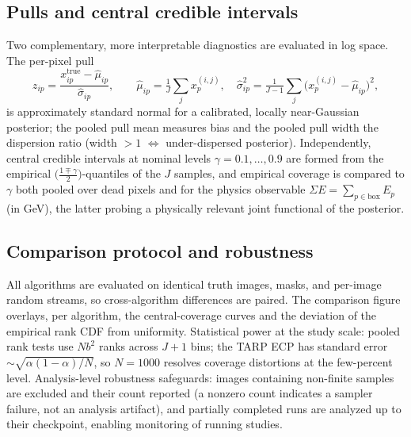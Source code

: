 \subsection{Pulls and central credible intervals}
\label{sec:validation:pulls}

Two complementary, more interpretable diagnostics are evaluated in log
space.  The per-pixel pull
\begin{equation}
  z_{ip} = \frac{x^{\mathrm{true}}_{ip} - \widehat{\mu}_{ip}}
                {\widehat{\sigma}_{ip}},
  \qquad
  \widehat{\mu}_{ip} = \tfrac{1}{J}\textstyle\sum_j x^{(i,j)}_p,
  \quad
  \widehat{\sigma}_{ip}^2 =
      \tfrac{1}{J-1}\textstyle\sum_j
      \bigl(x^{(i,j)}_p - \widehat{\mu}_{ip}\bigr)^2,
  \label{eq:pull}
\end{equation}
is approximately standard normal for a calibrated, locally
near-Gaussian posterior; the pooled pull mean measures bias and the
pooled pull width the dispersion ratio (width $> 1$ $\Leftrightarrow$
under-dispersed posterior).  Independently, central credible intervals
at nominal levels $\gamma = 0.1, \dots, 0.9$ are formed from the
empirical $\bigl(\tfrac{1\mp\gamma}{2}\bigr)$-quantiles of the $J$
samples, and empirical coverage is compared to $\gamma$ both pooled over
dead pixels and for the physics observable
$\Sigma E = \sum_{p \in \mathrm{box}} E_p$ (in GeV), the latter probing
a physically relevant joint functional of the posterior.

\subsection{Comparison protocol and robustness}
\label{sec:validation:protocol}

All algorithms are evaluated on identical truth images, masks, and
per-image random streams, so cross-algorithm differences are paired.
The comparison figure overlays, per algorithm, the central-coverage
curves and the deviation of the empirical rank CDF from uniformity.
Statistical power at the study scale: pooled rank tests use
$N b^2$ ranks across $J{+}1$ bins; the TARP ECP has standard error
$\sim \sqrt{\alpha(1-\alpha)/N}$, so $N = 1000$ resolves coverage
distortions at the few-percent level.  Analysis-level robustness
safeguards: images containing non-finite samples are excluded and their
count reported (a nonzero count indicates a sampler failure, not an
analysis artifact), and partially completed runs are analyzed up to
their checkpoint, enabling monitoring of running studies.

